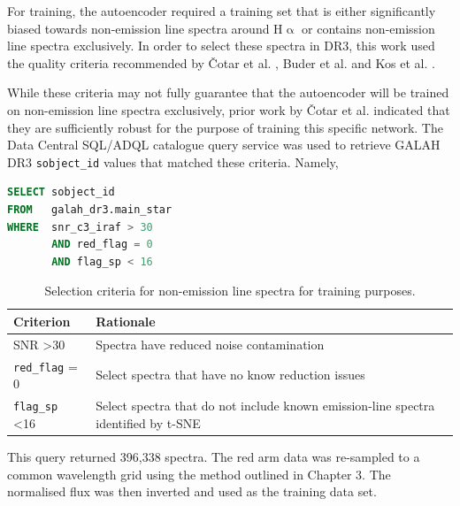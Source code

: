 For training, the autoencoder required a training set that is either significantly biased towards non-emission line spectra around H$\upalpha$ or contains non-emission line spectra exclusively. In order to select these spectra in DR3, this work used the quality criteria recommended by Čotar et al. \citep{vcotar2021galah}, Buder et al. \citep{buder2021galah+} and Kos et al. \citep{kos2017galah}. 

While these criteria may not fully guarantee that the autoencoder will be trained on non-emission line spectra exclusively, prior work by Čotar et al. indicated that they are sufficiently robust for the purpose of training this specific network. The Data Central SQL/ADQL catalogue query service was used to retrieve GALAH DR3 \texttt{sobject\_id} values that matched these criteria. Namely,

\begin{lstlisting}[language=SQL]
SELECT sobject_id
FROM   galah_dr3.main_star
WHERE  snr_c3_iraf > 30
       AND red_flag = 0
       AND flag_sp < 16 
\end{lstlisting}

\begin{table}[!htb]
\begin{center}
\begin{tabular}{|l|l|}
\hline
\textbf{Criterion}    & \textbf{Rationale}                                                                 \\ \hline
SNR \textgreater 30   & Spectra have reduced noise contamination      \\ \hline
\texttt{red\_flag} = 0         & Select spectra that have no know reduction issues                                  \\ \hline
\texttt{flag\_sp} \textless 16 & Select spectra that do not include known emission-line spectra identified by t-SNE \\ \hline
\end{tabular}
\caption{Selection criteria for non-emission line spectra for training purposes.}
\label{table:Selection Criteria}
\end{center}
\end{table}

This query returned 396,338 spectra. The red arm data was re-sampled to a common wavelength grid using the method outlined in Chapter 3. The normalised flux was then inverted and used as the training data set.

